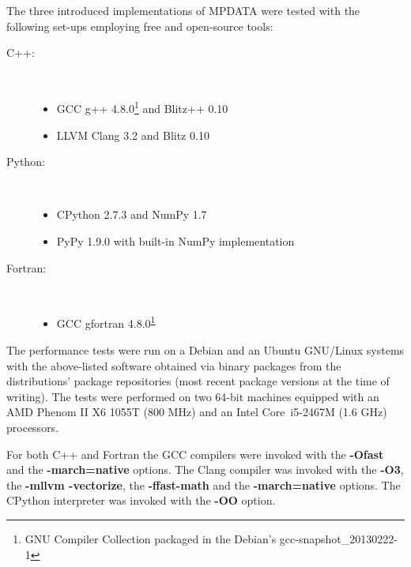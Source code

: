 \documentclass[twocolumn]{article}
\newcommand{\prog}[1]{{\rm\bf#1}}
\begin{document}
  The three introduced implementations of MPDATA were tested with the following set-ups 
    employing free and open-source tools:
  \begin{description}
    \item[C++:]{~
      \begin{itemize}
        \item{GCC g++ 4.8.0\footnote{\label{fnt:gcc-snapshot}GNU Compiler Collection packaged in the Debian's gcc-snapshot\_20130222-1} 
          and Blitz++ 0.10}
        \item{LLVM Clang 3.2 and Blitz 0.10}
      \end{itemize}
    }
    \item[Python:]{~
      \begin{itemize}
        \item{CPython 2.7.3 and NumPy 1.7}
        \item{PyPy 1.9.0 with built-in NumPy implementation}
      \end{itemize}
    }
    \item[Fortran:]{~
      \begin{itemize}
        \item{GCC gfortran 4.8.0\textsuperscript{\ref{fnt:gcc-snapshot}}}
      \end{itemize}
    }
  \end{description}
  The performance tests were run on a Debian and an Ubuntu GNU/Linux systems with the above-listed software obtained 
    via binary packages from the distributions' package repositories (most recent package versions at the time of writing).
  The tests were performed on two 64-bit machines equipped with
    an AMD Phenom\textsuperscript{\texttrademark} II X6 1055T (800 MHz)
    and an Intel\textsuperscript{\textregistered} Core\textsuperscript{\texttrademark}~i5-2467M (1.6 GHz)
    processors.

  For both C++ and Fortran the GCC compilers were invoked with the \prog{-Ofast} and the 
    \prog{-march=native} options.
  The Clang compiler was invoked with the \prog{-O3}, the \prog{-mllvm -vectorize}, the \prog{-ffast-math} 
    and the \prog{-march=native} options.
  The CPython interpreter was invoked with the \prog{-OO} option.
\end{document}

